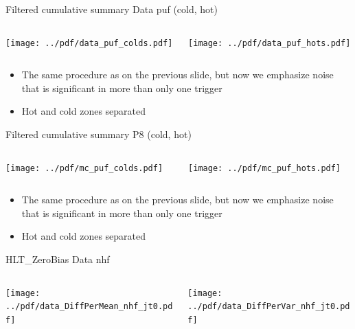 \documentclass[9pt]{beamer}
\begin{document}
\begin{frame}[t]{Filtered cumulative summary Data puf (cold, hot)}
\begin{columns}[T]
  \begin{column}{.5\textwidth}
  \texttt{[image: ../pdf/data\_puf\_colds.pdf]}
  \end{column}
  \begin{column}{.5\textwidth}
  \texttt{[image: ../pdf/data\_puf\_hots.pdf]}
  \end{column}
\end{columns}
\begin{itemize}
 \item The same procedure as on the previous slide, but now we emphasize noise that is significant in more than only one trigger
 \item Hot and cold zones separated
\end{itemize}
\end{frame}

\begin{frame}[t]{Filtered cumulative summary P8 (cold, hot)}
\begin{columns}[T]
  \begin{column}{.5\textwidth}
  \texttt{[image: ../pdf/mc\_puf\_colds.pdf]}
  \end{column}
  \begin{column}{.5\textwidth}
  \texttt{[image: ../pdf/mc\_puf\_hots.pdf]}
  \end{column}
\end{columns}
\begin{itemize}
 \item The same procedure as on the previous slide, but now we emphasize noise that is significant in more than only one trigger
 \item Hot and cold zones separated
\end{itemize}
\end{frame}


\begin{frame}[t]{HLT\_ZeroBias Data nhf}
\begin{columns}[T]
  \begin{column}{.5\textwidth}
  \texttt{[image: ../pdf/data\_DiffPerMean\_nhf\_jt0.pdf]}
  \end{column}
  \begin{column}{.5\textwidth}
  \texttt{[image: ../pdf/data\_DiffPerVar\_nhf\_jt0.pdf]}
  \end{column}
\end{columns}
\end{frame}
\end{document}
